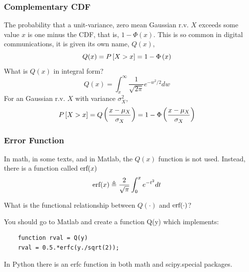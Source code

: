 \subsubsection{Complementary CDF}
The probability that a unit-variance, zero mean Gaussian r.v. $X$ exceeds some value $x$ is one minus the
CDF, that is, $1-\Phi(x)$.  This is so common in digital communications, it is given its
own name, $Q(x)$,
\[
  Q(x) = P\left[{X >  x}\right] = 1 - \Phi \left( x \right)
\]
What is $Q(x)$ in integral form?
\[
  Q(x) = \int_x^\infty \frac{1}{\sqrt{2\pi}} e^{-w^2/2} dw
\]
For an Gaussian r.v. $X$ with variance $\sigma_X^2$,
\[
  P\left[{X >  x}\right] = Q\left( \frac{x-\mu_X}{\sigma_X} \right)  = 1 - \Phi \left( \frac{x-\mu_X}{\sigma_X} \right)
\]

\subsubsection{Error Function}

In math, in some texts, and in Matlab, the $Q(x)$ function is not
used.  Instead, there is a function called $\mbox{erf}(x)$
\[
  \mbox{erf}(x) \triangleq \frac{2}{\sqrt{\pi}} \int_0^x e^{-t^2} dt
\]


  What is
the functional relationship between $Q(\cdot)$ and $\mbox{erf}(\cdot)$?

You should go to Matlab and create a function Q(y) which implements:
\begin{verbatim}
    function rval = Q(y)
    rval = 0.5.*erfc(y./sqrt(2));
\end{verbatim}
In Python there is an erfc function in both math and scipy.special packages.


